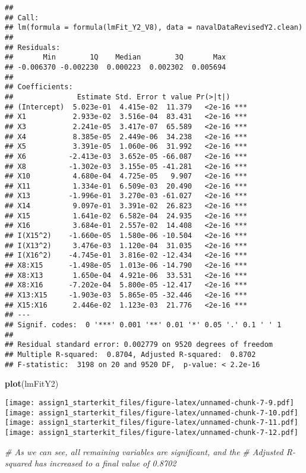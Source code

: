 \documentclass[
]{article}
\newenvironment{Shaded}{\begin{snugshade}}{\end{snugshade}}
\newcommand{\CommentTok}[1]{\textcolor[rgb]{0.56,0.35,0.01}{\textit{#1}}}
\newcommand{\KeywordTok}[1]{\textcolor[rgb]{0.13,0.29,0.53}{\textbf{#1}}}
\newcommand{\NormalTok}[1]{#1}
\begin{document}
\begin{verbatim}
## 
## Call:
## lm(formula = formula(lmFit_Y2_V8), data = navalDataRevisedY2.clean)
## 
## Residuals:
##       Min        1Q    Median        3Q       Max 
## -0.006370 -0.002230  0.000223  0.002302  0.005694 
## 
## Coefficients:
##               Estimate Std. Error t value Pr(>|t|)    
## (Intercept)  5.023e-01  4.415e-02  11.379   <2e-16 ***
## X1           2.933e-02  3.516e-04  83.431   <2e-16 ***
## X3           2.241e-05  3.417e-07  65.589   <2e-16 ***
## X4           8.385e-05  2.449e-06  34.238   <2e-16 ***
## X5           3.391e-05  1.060e-06  31.992   <2e-16 ***
## X6          -2.413e-03  3.652e-05 -66.087   <2e-16 ***
## X8          -1.302e-03  3.155e-05 -41.281   <2e-16 ***
## X10          4.680e-04  4.725e-05   9.907   <2e-16 ***
## X11          1.334e-01  6.509e-03  20.490   <2e-16 ***
## X13         -1.996e-01  3.270e-03 -61.027   <2e-16 ***
## X14          9.097e-01  3.391e-02  26.823   <2e-16 ***
## X15          1.641e-02  6.582e-04  24.935   <2e-16 ***
## X16          3.684e-01  2.557e-02  14.408   <2e-16 ***
## I(X15^2)    -1.660e-05  1.580e-06 -10.504   <2e-16 ***
## I(X13^2)     3.476e-03  1.120e-04  31.035   <2e-16 ***
## I(X16^2)    -4.745e-01  3.816e-02 -12.434   <2e-16 ***
## X8:X15      -1.498e-05  1.013e-06 -14.790   <2e-16 ***
## X8:X13       1.650e-04  4.921e-06  33.531   <2e-16 ***
## X8:X16      -7.202e-04  5.800e-05 -12.417   <2e-16 ***
## X13:X15     -1.903e-03  5.865e-05 -32.446   <2e-16 ***
## X15:X16      2.446e-02  1.123e-03  21.776   <2e-16 ***
## ---
## Signif. codes:  0 '***' 0.001 '**' 0.01 '*' 0.05 '.' 0.1 ' ' 1
## 
## Residual standard error: 0.002779 on 9520 degrees of freedom
## Multiple R-squared:  0.8704, Adjusted R-squared:  0.8702 
## F-statistic:  3198 on 20 and 9520 DF,  p-value: < 2.2e-16
\end{verbatim}

\begin{Shaded}
\begin{Highlighting}[]
\KeywordTok{plot}\NormalTok{(lmFitY2)}
\end{Highlighting}
\end{Shaded}

\texttt{[image: assign1\_starterkit\_files/figure-latex/unnamed-chunk-7-9.pdf]}
\texttt{[image: assign1\_starterkit\_files/figure-latex/unnamed-chunk-7-10.pdf]}
\texttt{[image: assign1\_starterkit\_files/figure-latex/unnamed-chunk-7-11.pdf]}
\texttt{[image: assign1\_starterkit\_files/figure-latex/unnamed-chunk-7-12.pdf]}

\begin{Shaded}
\begin{Highlighting}[]
\CommentTok{# As we can see, all remaining variables are significant, and the }
\CommentTok{# Adjusted R-squared has increased to a final value of 0.8702}
\end{Highlighting}
\end{Shaded}
\end{document}

